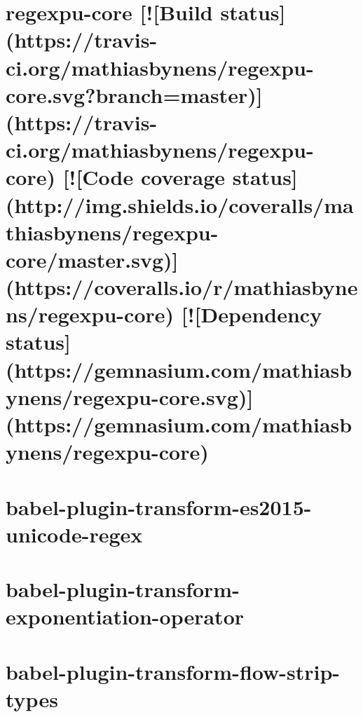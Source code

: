 \documentclass[twoside]{book}
\newcommand{\+}{\discretionary{\mbox{\scriptsize$\hookleftarrow$}}{}{}}
\begin{document}
\chapter{regexpu-\/core \mbox{[}!\mbox{[}Build status\mbox{]}(https\+://travis-\/ci.org/mathiasbynens/regexpu-\/core.svg?branch=master)\mbox{]}(https\+://travis-\/ci.org/mathiasbynens/regexpu-\/core) \mbox{[}!\mbox{[}Code coverage status\mbox{]}(http\+://img.shields.\+io/coveralls/mathiasbynens/regexpu-\/core/master.svg)\mbox{]}(https\+://coveralls.io/r/mathiasbynens/regexpu-\/core) \mbox{[}!\mbox{[}Dependency status\mbox{]}(https\+://gemnasium.com/mathiasbynens/regexpu-\/core.svg)\mbox{]}(https\+://gemnasium.com/mathiasbynens/regexpu-\/core)}
\label{md__c_1_workspace_demo_src_main_script_node_modules_babel-plugin-transform-es2015-unicode-regex_92229df0ac1ce58724a0554a1e890193}

\chapter{babel-\/plugin-\/transform-\/es2015-\/unicode-\/regex}
\label{md__c_1_workspace_demo_src_main_script_node_modules_babel-plugin-transform-es2015-unicode-regex__r_e_a_d_m_e}

\chapter{babel-\/plugin-\/transform-\/exponentiation-\/operator}
\label{md__c_1_workspace_demo_src_main_script_node_modules_babel-plugin-transform-exponentiation-operator__r_e_a_d_m_e}

\chapter{babel-\/plugin-\/transform-\/flow-\/strip-\/types}
\label{md__c_1_workspace_demo_src_main_script_node_modules_babel-plugin-transform-flow-strip-types__r_e_a_d_m_e}

\end{document}

